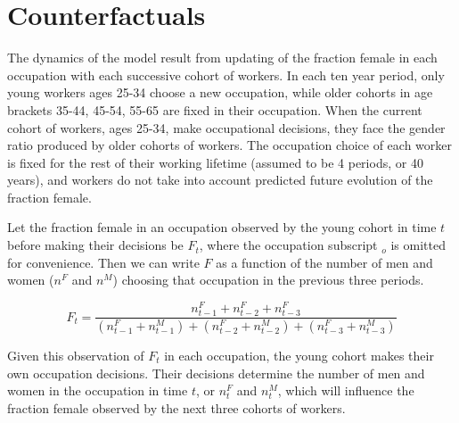 \documentclass[11pt]{article}
\begin{document}

\section{Counterfactuals} \label{counterfactuals}
The dynamics of the model result from updating of the fraction female in each occupation with each successive cohort of workers. In each ten year period, only young workers ages 25-34 choose a new occupation, while older cohorts in age brackets 35-44, 45-54, 55-65 are fixed in their occupation. When the current cohort of workers, ages 25-34, make occupational decisions, they face the gender ratio produced by older cohorts of workers. The occupation choice of each worker is fixed for the rest of their working lifetime (assumed to be 4 periods, or 40 years), and workers do not take into account predicted future evolution of the fraction female. 



Let the fraction female in an occupation observed by the young cohort in time $t$ before making their decisions be $F_t$, where the occupation subscript $_o$ is omitted for convenience. Then we can write $F$ as a function of the number of men and women ($n^F$ and $n^M$) choosing that occupation in the previous three periods.


$$F_t = \frac{n^F_{t-1} + n^F_{t-2} + n^F_{t-3}}{(n^F_{t-1} + n^M_{t-1}) + (n^F_{t-2} + n^M_{t-2}) + (n^F_{t-3} + n^M_{t-3}) } $$

Given this observation of $F_t$ in each occupation, the young cohort makes their own occupation decisions. Their decisions determine the number of men and women in the occupation in time $t$, or $n^F_t$ and $n^M_t$, which will influence the fraction female observed by the next three cohorts of workers.
\end{document}
